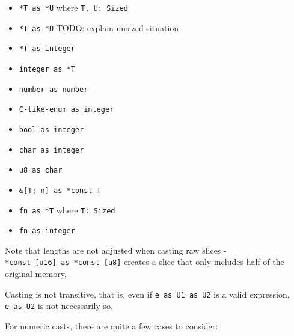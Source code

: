 \documentclass[a4paper,]{book}
\begin{document}
\begin{itemize}
\itemsep1pt\parskip0pt
\item
  \texttt{*T\ as\ *U} where \texttt{T,\ U:\ Sized}
\item
  \texttt{*T\ as\ *U} TODO: explain unsized situation
\item
  \texttt{*T\ as\ integer}
\item
  \texttt{integer\ as\ *T}
\item
  \texttt{number\ as\ number}
\item
  \texttt{C-like-enum\ as\ integer}
\item
  \texttt{bool\ as\ integer}
\item
  \texttt{char\ as\ integer}
\item
  \texttt{u8\ as\ char}
\item
  \texttt{\&{[}T;\ n{]}\ as\ *const\ T}
\item
  \texttt{fn\ as\ *T} where \texttt{T:\ Sized}
\item
  \texttt{fn\ as\ integer}
\end{itemize}

Note that lengths are not adjusted when casting raw slices -
\texttt{*const\ {[}u16{]}\ as\ *const\ {[}u8{]}} creates a slice that
only includes half of the original memory.

Casting is not transitive, that is, even if \texttt{e\ as\ U1\ as\ U2}
is a valid expression, \texttt{e\ as\ U2} is not necessarily so.

For numeric casts, there are quite a few cases to consider:
\end{document}
